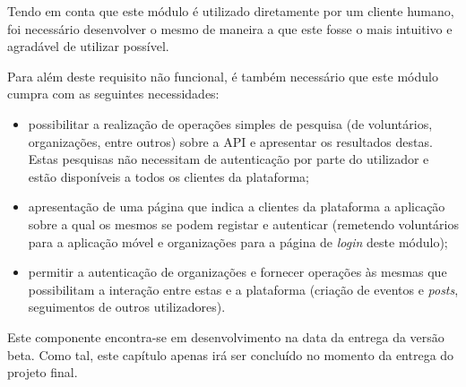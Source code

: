 Tendo em conta que este módulo é utilizado diretamente por um cliente humano, foi necessário desenvolver o mesmo de maneira a que este fosse o mais intuitivo e agradável de utilizar possível. 

\par \medskip

Para além deste requisito não funcional, é também necessário que este módulo cumpra com as seguintes necessidades:

\begin{itemize}
	\item possibilitar a realização de operações simples de pesquisa (de voluntários, organizações, entre outros) sobre a API e apresentar os resultados destas. Estas pesquisas não necessitam de autenticação por parte do utilizador e estão disponíveis a todos os clientes da plataforma;
	\item apresentação de uma página que indica a clientes da plataforma a aplicação sobre a qual os mesmos se podem registar e autenticar (remetendo voluntários para a aplicação móvel e organizações para a página de \textit{login} deste módulo);
	\item permitir a autenticação de organizações e fornecer operações às mesmas que possibilitam a interação entre estas e a plataforma (criação de eventos e \textit{posts}, seguimentos de outros utilizadores).
\end{itemize}

\bigskip \bigskip

Este componente encontra-se em desenvolvimento na data da entrega da versão beta. Como tal, este capítulo apenas irá ser concluído no momento da entrega do projeto final.

\fi